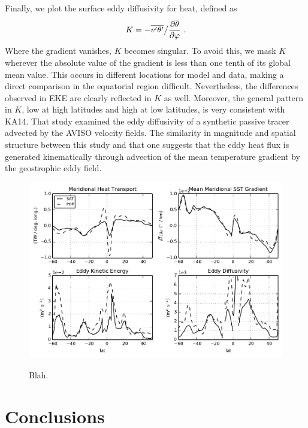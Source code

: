 \documentclass[10pt]{article}
\newcommand{\pd}[2]{ \frac{\partial #1}{\partial #2} }
\newcommand{\ol}{\ensuremath{\overline}}
\begin{document}
Finally, we plot the surface eddy diffusivity for heat, defined as
\begin{equation}
K = - \ol{v'\theta'} \big / \pd{\ol{\theta}}{\varphi} \ .
\end{equation}
Where the gradient vanishes, $K$ becomes singular. To avoid this, we mask $K$ wherever the absolute value of the gradient is less than one tenth of its global mean value. This occurs in different locations for model and data, making a direct comparison in the equatorial region difficult. Nevertheless, the differences observed in EKE are clearly reflected in $K$ as well. Moreover, the general pattern in $K$, low at high latitudes and high at low latitudes, is very consistent with KA14. That study examined the eddy diffusivity of a synthetic passive tracer advected by the AVISO velocity fields. The similarity in magnitude and spatial structure between this study and that one suggests that the eddy heat flux is generated kinematically through advection of the mean temperature gradient by the geostrophic eddy field.

\begin{figure}[t!]
  \noindent \includegraphics{../figures/MHT_gradient_EKE_diffusivity.pdf}\\
  \caption{Blah.}
  \label{fig:H}
\end{figure}

\section{Conclusions}

\end{document}
